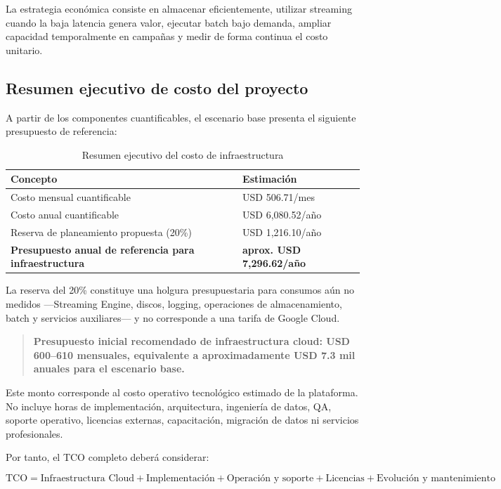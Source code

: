 \documentclass[11pt,a4paper]{article}
\begin{document}
La estrategia económica consiste en almacenar eficientemente, utilizar streaming cuando la baja latencia genera valor, ejecutar batch bajo demanda, ampliar capacidad temporalmente en campañas y medir de forma continua el costo unitario.

\subsection{Resumen ejecutivo de costo del proyecto}
A partir de los componentes cuantificables, el escenario base presenta el siguiente presupuesto de referencia:

\begin{table}[H]
\caption{Resumen ejecutivo del costo de infraestructura}\label{tab:resumen-costos}
\small
\begin{tabularx}{\linewidth}{@{}XY@{}}\toprule
Concepto & Estimación\\\midrule
Costo mensual cuantificable & USD 506.71/mes\\
Costo anual cuantificable & USD 6,080.52/año\\
Reserva de planeamiento propuesta (20\%) & USD 1,216.10/año\\
\textbf{Presupuesto anual de referencia para infraestructura} & \textbf{aprox. USD 7,296.62/año}\\\bottomrule
\end{tabularx}
\end{table}

La reserva del 20\% constituye una holgura presupuestaria para consumos aún no medidos —Streaming Engine, discos, logging, operaciones de almacenamiento, batch y servicios auxiliares— y no corresponde a una tarifa de Google Cloud.

\begin{quote}
\textbf{Presupuesto inicial recomendado de infraestructura cloud: USD 600--610 mensuales, equivalente a aproximadamente USD 7.3 mil anuales para el escenario base.}
\end{quote}

Este monto corresponde al costo operativo tecnológico estimado de la plataforma. No incluye horas de implementación, arquitectura, ingeniería de datos, QA, soporte operativo, licencias externas, capacitación, migración de datos ni servicios profesionales.

Por tanto, el TCO completo deberá considerar:

\[
\text{TCO}
=
\text{Infraestructura Cloud}
+
\text{Implementación}
+
\text{Operación y soporte}
+
\text{Licencias}
+
\text{Evolución y mantenimiento}
\]
\end{document}
